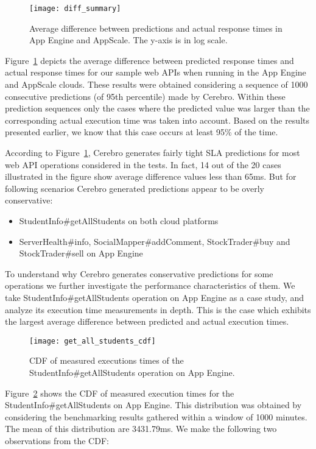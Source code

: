 \begin{figure}
\centering
\texttt{[image: diff\_summary]}
\caption{Average difference between predictions and actual response times in App Engine and AppScale. The y-axis is in log scale.}
\label{fig:diff_summary}
\end{figure}

Figure~\ref{fig:diff_summary} depicts the average difference between predicted response times and actual response times for
our sample web APIs when running in the App Engine and AppScale clouds. 
These results were obtained considering a sequence of 1000 consecutive predictions (of 95th percentile) made by Cerebro. 
Within these prediction sequences only the cases 
where the predicted value was larger than the corresponding actual execution time was taken into account. Based on the results
presented earlier, we know that this case occurs at least 95\% of the time.

According to Figure~\ref{fig:diff_summary}, Cerebro generates fairly tight SLA predictions for most web API operations considered in the tests. In fact,
14 out of the 20 cases illustrated in the figure show average difference values less than 65ms. But for following scenarios Cerebro generated
predictions appear to be overly conservative:

\begin{itemize}
\item StudentInfo\#getAllStudents on both cloud platforms
\item ServerHealth\#info, SocialMapper\#addComment, StockTrader\#buy and StockTrader\#sell on App Engine
\end{itemize}

To understand why Cerebro generates conservative predictions for some operations we further 
investigate the performance characteristics of them. We take StudentInfo\#getAllStudents
operation on App Engine as a case study, and analyze its execution time measurements in depth. 
This is the case which exhibits the largest average difference between predicted and actual execution times.

\begin{figure}
\centering
\texttt{[image: get\_all\_students\_cdf]}
\caption{CDF of measured executions times of the StudentInfo\#getAllStudents operation on App Engine.}
\label{fig:get_all_students_cdf}
\end{figure}

Figure~\ref{fig:get_all_students_cdf} shows the CDF of measured execution times for the StudentInfo\#getAllStudents on
App Engine. This distribution was obtained by considering the benchmarking results gathered within a window of 1000 minutes. 
The mean of this distribution are 3431.79ms. We make the following two observations from the
CDF:

